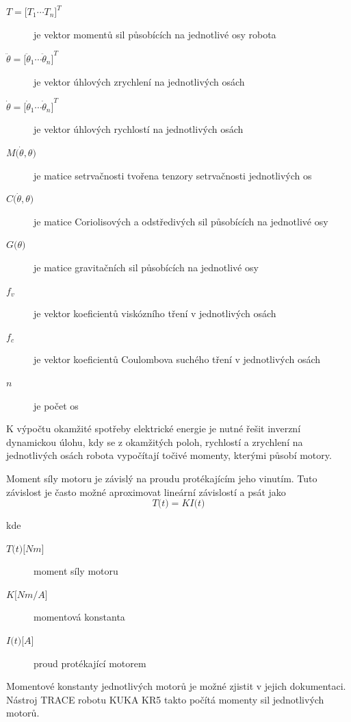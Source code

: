 \begin{description}
\item[$T = {\big[T_1  \dotsm  T_n\big]}^{T}$] je vektor momentů sil působících na jednotlivé osy robota
\item[$\ddot \theta = {\big[\ddot \theta_1  \dotsm  \ddot \theta_n\big]}^{T}$] je vektor úhlových zrychlení na jednotlivých osách
\item[$\dot \theta = {\big[\dot \theta_1  \dotsm  \dot \theta_n\big]}^{T}$] je vektor úhlových rychlostí na jednotlivých osách
\item[$M\big(\dot \theta, \theta\big)$] je matice setrvačnosti tvořena tenzory setrvačnosti jednotlivých os
\item[$C\big(\dot \theta, \theta\big)$] je matice Coriolisových a odstředivých sil působících na jednotlivé osy
\item[$G\big(\theta\big)$] je matice gravitačních sil působících na jednotlivé osy
\item[$f_v$] je vektor koeficientů viskózního tření v jednotlivých osách
\item[$f_c$] je vektor koeficientů Coulombova suchého tření v jednotlivých osách
\item[$n$] je počet os
\end{description}

K výpočtu okamžité spotřeby elektrické energie je nutné řešit inverzní dynamickou úlohu, kdy se z okamžitých poloh, rychlostí a zrychlení na jednotlivých osách robota vypočítají točivé momenty, kterými působí motory. 

Moment síly motoru je závislý na proudu protékajícím jeho vinutím. Tuto závislost je často možné aproximovat lineární závislostí a psát jako
\begin{equation}
T\big(t\big) = KI\big(t\big)
\label{torque_current_eq}
\end{equation}

kde

\begin{description}
\item[$T\big(t\big) {\big[Nm\big]}$] moment síly motoru 
\item[$K {\big[Nm/A\big]}$] momentová konstanta 
\item[$I\big(t\big) {\big[A\big]}$] proud protékající motorem 
\end{description}

Momentové konstanty jednotlivých motorů je možné zjistit v jejich dokumentaci. Nástroj TRACE robotu KUKA KR5 takto počítá momenty sil jednotlivých motorů. 

